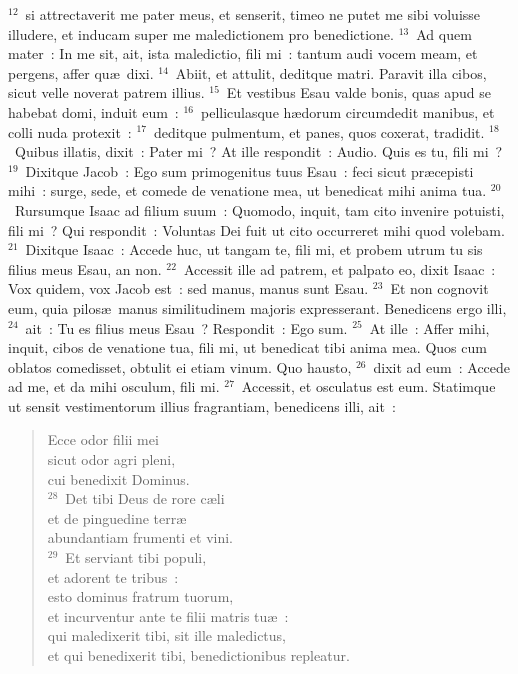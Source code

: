 ${}^{12}$~si attrectaverit me pater meus, et senserit, timeo ne putet me sibi voluisse illudere, et inducam super me maledictionem pro benedictione.
${}^{13}$~Ad quem mater~: In me sit, ait, ista maledictio, fili mi~: tantum audi vocem meam, et pergens, affer qu\ae\ dixi.
${}^{14}$~Abiit, et attulit, deditque matri. Paravit illa cibos, sicut velle noverat patrem illius.
${}^{15}$~Et vestibus Esau valde bonis, quas apud se habebat domi, induit eum~:
${}^{16}$~pelliculasque h\ae dorum circumdedit manibus, et colli nuda protexit~:
${}^{17}$~deditque pulmentum, et panes, quos coxerat, tradidit.
${}^{18}$~Quibus illatis, dixit~: Pater mi~? At ille respondit~: Audio. Quis es tu, fili mi~?
${}^{19}$~Dixitque Jacob~: Ego sum primogenitus tuus Esau~: feci sicut pr\ae cepisti mihi~: surge, sede, et comede de venatione mea, ut benedicat mihi anima tua.
${}^{20}$~Rursumque Isaac ad filium suum~: Quomodo, inquit, tam cito invenire potuisti, fili mi~? Qui respondit~: Voluntas Dei fuit ut cito occurreret mihi quod volebam.
${}^{21}$~Dixitque Isaac~: Accede huc, ut tangam te, fili mi, et probem utrum tu sis filius meus Esau, an non.
${}^{22}$~Accessit ille ad patrem, et palpato eo, dixit Isaac~: Vox quidem, vox Jacob est~: sed manus, manus sunt Esau.
${}^{23}$~Et non cognovit eum, quia pilos\ae\ manus similitudinem majoris expresserant. Benedicens ergo illi,
${}^{24}$~ait~: Tu es filius meus Esau~? Respondit~: Ego sum.
${}^{25}$~At ille~: Affer mihi, inquit, cibos de venatione tua, fili mi, ut benedicat tibi anima mea. Quos cum oblatos comedisset, obtulit ei etiam vinum. Quo hausto,
${}^{26}$~dixit ad eum~: Accede ad me, et da mihi osculum, fili mi.
${}^{27}$~Accessit, et osculatus est eum. Statimque ut sensit vestimentorum illius fragrantiam, benedicens illi, ait~: \begin{flushleft}\begin{verse}Ecce odor filii mei\\ sicut odor agri pleni,\\ cui benedixit Dominus.\\
${}^{28}$~Det tibi Deus de rore c\ae li\\ et de pinguedine terr\ae \\ abundantiam frumenti et vini.\\
${}^{29}$~Et serviant tibi populi,\\ et adorent te tribus~:\\ esto dominus fratrum tuorum,\\ et incurventur ante te filii matris tu\ae~:\\ qui maledixerit tibi, sit ille maledictus,\\ et qui benedixerit tibi, benedictionibus repleatur.\end{verse}\end{flushleft}


